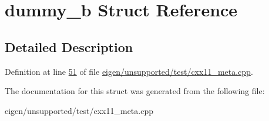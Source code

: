 \hypertarget{structdummy__b}{}\section{dummy\+\_\+b Struct Reference}
\label{structdummy__b}


\subsection{Detailed Description}


Definition at line \hyperlink{eigen_2unsupported_2test_2cxx11__meta_8cpp_source_l00051}{51} of file \hyperlink{eigen_2unsupported_2test_2cxx11__meta_8cpp_source}{eigen/unsupported/test/cxx11\+\_\+meta.\+cpp}.



The documentation for this struct was generated from the following file\+:\begin{DoxyCompactItemize}
\item 
eigen/unsupported/test/cxx11\+\_\+meta.\+cpp\end{DoxyCompactItemize}
